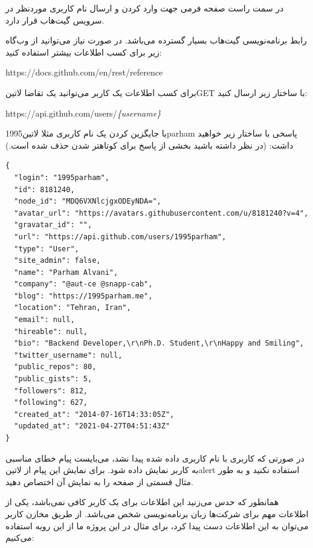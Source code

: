 \documentclass[../main.tex]{subfiles}
\begin{document}
در سمت راست صفحه فرمی جهت وارد کردن و ارسال نام کاربری موردنظر در سرویس گیت‌هاب قرار دارد.

رابط برنامه‌نویسی گیت‌هاب بسیار گسترده می‌باشد. در صورت نیاز می‌توانید از وب‌گاه زیر برای کسب اطلاعات بیشتر استفاده کنید:

\begin{latin}\begin{center}
https://docs.github.com/en/rest/reference
\end{center}\end{latin}

برای کسب اطلاعات یک کاربر می‌توانید یک تقاضا ‌لاتین{GET} با ساختار زیر ارسال کنید:

\begin{latin}\begin{center}
https://api.github.com/users/\textit{\{username\}}
\end{center}\end{latin}

با جایگزین کردن یک نام کاربری مثلا ‌لاتین{1995parham} پاسخی با ساختار زیر خواهید داشت:
(در نظر داشته باشید بخشی از پاسخ برای کوتاهتر شدن حذف شده است.)

\begin{latin}
\begin{verbatim}
{
  "login": "1995parham",
  "id": 8181240,
  "node_id": "MDQ6VXNlcjgxODEyNDA=",
  "avatar_url": "https://avatars.githubusercontent.com/u/8181240?v=4",
  "gravatar_id": "",
  "url": "https://api.github.com/users/1995parham",
  "type": "User",
  "site_admin": false,
  "name": "Parham Alvani",
  "company": "@aut-ce @snapp-cab",
  "blog": "https://1995parham.me",
  "location": "Tehran, Iran",
  "email": null,
  "hireable": null,
  "bio": "Backend Developer,\r\nPh.D. Student,\r\nHappy and Smiling",
  "twitter_username": null,
  "public_repos": 80,
  "public_gists": 5,
  "followers": 812,
  "following": 627,
  "created_at": "2014-07-16T14:33:05Z",
  "updated_at": "2021-04-27T04:51:43Z"
}
\end{verbatim}
\end{latin}

در صورتی که کاربری با نام کاربری داده شده پیدا نشد، می‌بایست پیام خطای مناسبی به کاربر نمایش داده شود.
برای نمایش این پیام از ‌لاتین{alert} استفاده نکنید و به طور مثال قسمتی از صفحه را به نمایش آن اختصاص دهید.

همانطور که حدس می‌زنید این اطلاعات برای یک کاربر کافی نمی‌باشد، یکی از اطلاعات مهم برای شرکت‌ها زبان برنامه‌نویسی شخص می‌باشد.
از طریق مخازن کاربر می‌توان به این اطلاعات دست پیدا کرد، برای مثال در این پروژه ما از این رویه استفاده می‌کنیم:
\end{document}
